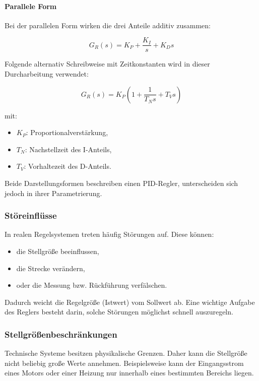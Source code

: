 \documentclass[11pt,a4paper]{article}
\begin{document}
\paragraph{Parallele Form}

Bei der parallelen Form wirken die drei Anteile additiv zusammen:

\begin{equation}
G_R(s) = K_P + \frac{K_I}{s} + K_D s
\end{equation}

Folgende alternativ Schreibweise mit Zeitkonstanten wird in dieser Durcharbeitung verwendet:

\begin{equation}
G_R(s) = K_P \left(1 + \frac{1}{T_N s} + T_V s\right)
\end{equation}

mit:
\begin{itemize}
\item $K_P$: Proportionalverstärkung,
\item $T_N$: Nachstellzeit des I-Anteils,
\item $T_V$: Vorhaltezeit des D-Anteils.
\end{itemize}

Beide Darstellungsformen beschreiben einen PID-Regler, unterscheiden sich jedoch in ihrer Parametrierung.

\subsubsection{Störeinflüsse}

In realen Regelsystemen treten häufig Störungen auf. Diese können:
\begin{itemize}
\item die Stellgröße beeinflussen,
\item die Strecke verändern,
\item oder die Messung bzw. Rückführung verfälschen.
\end{itemize}

Dadurch weicht die Regelgröße (Istwert) vom Sollwert ab. Eine wichtige Aufgabe des Reglers besteht darin, solche Störungen möglichst schnell auszuregeln.

\subsubsection{Stellgrößenbeschränkungen}

Technische Systeme besitzen physikalische Grenzen. Daher kann die Stellgröße nicht beliebig große Werte annehmen. Beispielsweise kann der Eingangsstrom eines Motors oder einer Heizung nur innerhalb eines bestimmten Bereichs liegen. 
\end{document}
